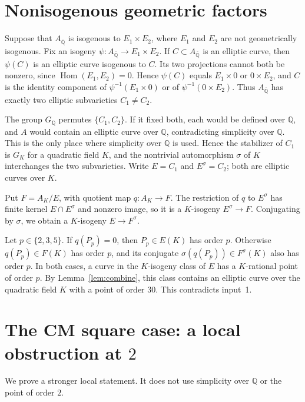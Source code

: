 \documentclass[11pt]{article}
\newcommand{\Q}{\mathbb Q}
\DeclareMathOperator{\Hom}{Hom}
\begin{document}
\section{Nonisogenous geometric factors}\label{sec:nonisogenous}

Suppose that \(A_{\overline{\Q}}\) is isogenous to \(E_1\times E_2\),
where \(E_1\) and \(E_2\) are not geometrically isogenous. Fix an
isogeny \(\psi:A_{\overline{\Q}}\to E_1\times E_2\). If
\(C\subset A_{\overline{\Q}}\) is an elliptic curve, then
\(\psi(C)\) is an elliptic curve isogenous to \(C\). Its two
projections cannot both be nonzero, since \(\Hom(E_1,E_2)=0\). Hence
\(\psi(C)\) equals \(E_1\times0\) or \(0\times E_2\), and \(C\) is the
identity component of \(\psi^{-1}(E_1\times0)\) or of
\(\psi^{-1}(0\times E_2)\). Thus \(A_{\overline{\Q}}\) has exactly two
elliptic subvarieties \(C_1\neq C_2\).

The group \(G_{\Q}\) permutes \(\{C_1,C_2\}\). If it fixed both, each
would be defined over \(\Q\), and \(A\) would contain an elliptic curve
over \(\Q\), contradicting simplicity over \(\Q\). This is the only
place where simplicity over \(\Q\) is used. Hence the stabilizer of
\(C_1\) is \(G_K\) for a quadratic field \(K\), and the nontrivial
automorphism \(\sigma\) of \(K\) interchanges the two subvarieties.
Write \(E=C_1\) and \(E^\sigma=C_2\); both are elliptic curves over
\(K\).

Put \(F=A_K/E\), with quotient map \(q:A_K\to F\). The restriction of
\(q\) to \(E^\sigma\) has finite kernel \(E\cap E^\sigma\) and nonzero
image, so it is a \(K\)-isogeny \(E^\sigma\to F\). Conjugating by
\(\sigma\), we obtain a \(K\)-isogeny \(E\to F^\sigma\).

Let \(p\in\{2,3,5\}\). If \(q(P_p)=0\), then \(P_p\in E(K)\) has
order \(p\). Otherwise \(q(P_p)\in F(K)\) has order \(p\), and its
conjugate \(\sigma(q(P_p))\in F^\sigma(K)\) also has order \(p\). In
both cases, a curve in the \(K\)-isogeny class of \(E\) has a
\(K\)-rational point of order \(p\). By Lemma~\ref{lem:combine}, this
class contains an elliptic curve over the quadratic field \(K\) with a
point of order \(30\). This contradicts input~1.

\section{The CM square case: a local obstruction at \(2\)}\label{sec:cm}

We prove a stronger local statement. It does not use simplicity over
\(\Q\) or the point of order \(2\).
\end{document}
